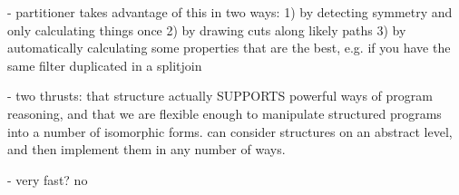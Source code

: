   - partitioner takes advantage of this in two ways: 
    1) by detecting symmetry and only calculating things once
    2) by drawing cuts along likely paths
    3) by automatically calculating some properties that are the best,
       e.g. if you have the same filter duplicated in a splitjoin

- two thrusts: that structure actually SUPPORTS powerful ways of
program reasoning, and that we are flexible enough to manipulate
structured programs into a number of isomorphic forms.  can consider
structures on an abstract level, and then implement them in any number
of ways.

- very fast?  no
